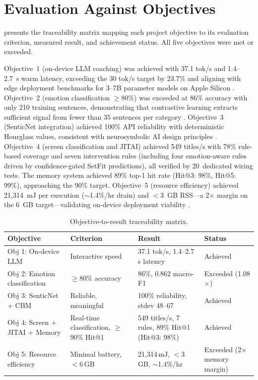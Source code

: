 \section{Evaluation Against Objectives}
\label{sec:objectives-evaluation}

 presents the traceability matrix mapping each project objective to its evaluation criterion, measured result, and achievement status. All five objectives were met or exceeded.

Objective~1 (on-device LLM coaching) was achieved with 37.1 tok/s and 1.4--2.7~s warm latency, exceeding the 30 tok/s target by 23.7\% and aligning with edge deployment benchmarks for 3--7B parameter models on Apple Silicon \cite{lin2025, xu2024}. Objective~2 (emotion classification $\geq$80\%) was exceeded at 86\% accuracy with only 210 training sentences, demonstrating that contrastive learning extracts sufficient signal from fewer than 35 sentences per category \cite{reimers2019, cambria2016}. Objective~3 (SenticNet integration) achieved 100\% API reliability with deterministic Hourglass values, consistent with neurosymbolic AI design principles \cite{cambria2024}. Objective~4 (screen classification and JITAI) achieved 549 titles/s with 78\% rule-based coverage and seven intervention rules (including four emotion-aware rules driven by confidence-gated SetFit predictions), all verified by 20~dedicated wiring tests. The memory system achieved 89\% top-1 hit rate (Hit@3: 98\%, Hit@5: 99\%), approaching the 90\% target. Objective~5 (resource efficiency) achieved 21,314~mJ per execution ($\sim$1.4\%/hr drain) and $<$3~GB RSS---a 2$\times$ margin on the 6~GB target---validating on-device deployment viability \cite{hannun2023}.

\begin{table}[htbp]
  \centering
  \caption{Objective-to-result traceability matrix.}
  \label{tab:traceability-matrix}
  \begin{tabular}{|p{2.5cm}|p{2.8cm}|p{4.2cm}|p{3.2cm}|}
    \hline
    \textbf{Objective} & \textbf{Criterion} & \textbf{Result} & \textbf{Status} \\
    \hline
    Obj 1: On-device LLM & Interactive speed & 37.1 tok/s, 1.4--2.7\,s latency & Achieved \\[4pt]
    \hline
    Obj 2: Emotion classification & $\geq$80\% accuracy & 86\%, 0.862 macro-F1 & Exceeded (1.08$\times$) \\[4pt]
    \hline
    Obj 3: SenticNet + CBM & Reliable, meaningful & 100\% reliability, stdev 48--67 & Achieved \\[4pt]
    \hline
    Obj 4: Screen + JITAI + Memory & Real-time classification, $\geq$90\% Hit@1 & 549 titles/s, 7 rules, 89\% Hit@1 (Hit@3: 98\%) & Achieved \\[4pt]
    \hline
    Obj 5: Resource efficiency & Minimal battery, $<$6\,GB & 21,314\,mJ, $<$3\,GB, $\sim$1.4\%/hr & Exceeded (2$\times$ memory margin) \\
    \hline
  \end{tabular}
\end{table}

